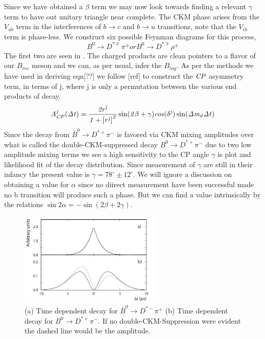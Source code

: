 Since we have obtained a $\beta$ term we may now look towards finding a relevant $\gamma$ term to have out unitary triangle near complete. The CKM phase arises from the $V_{ub}$ term in the interferences of $b\rightarrow c \mbox{ and } b \rightarrow u$ transitions, note that the $V_{cb}$ term is phase-less. We construct six possible Feynman diagrams for this process,
\[B^0 \rightarrow D^{*\mp}\pi^{\pm} or B^0 \rightarrow D^{*\mp}\rho^{\pm} \]
The first two are seen in \label{pBGD}. The charged products are clean pointers to a flavor of our $B_{rec}$ meson and we can, as per usual, infer the $B_{tag}$. As per the methods we have used in deriving eqn[??] we follow [ref] to construct the $\it{CP}$ asymmetry term, in terms of j, where j is only a permutation between the various end products of decay.
\[\it{A}^{j}_{\it{CP}}(\Delta t) = \frac{2r^j}{1+\left[r^j\right]^2}\sin(2 \beta +\gamma)cos(\delta^j)\sin(\Delta m_d \Delta t)\]
Since the decay from $\bar{B}^0 \rightarrow D^{*+}\pi^{-}$ is favored via CKM mixing amplitudes over what is called the double-CKM-suppressed decay $B^0 \rightarrow D^{*+}\pi^{-}$ due to two low amplitude mixing terms we see a high sensitivity to the CP angle $\gamma$  \label{kino1} is plot and likelihood fit of the decay distribution. Since measurement of $\gamma$ are still in their infancy the present value is $\gamma = 78^{\circ}\pm12^{\circ}$. We will ignore a discussion on obtaining a value for $\alpha$ since no diirect measurement have been successful made no b transition will produce such a phase. But we can find a value intrinsically by the relations $\sin2\alpha = - \sin(2\beta +2\gamma)$.

 \begin{figure}[h]
\centering
\includegraphics[width=0.6\textwidth]{figs/kino.JPG}
\caption{(a) Time dependent decay for $\bar{B}^0 \rightarrow D^{*-}\pi^{+}$ (b) Time dependent decay for $B^0 \rightarrow D^{*+}\pi^{-}$. If no double-CKM-Suppression were evident the dashed line would be the amplitude.}
\label{kino1}
\end{figure}

